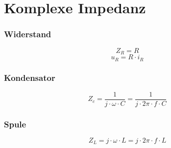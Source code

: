 



\section{Komplexe Impedanz}

\subsubsection{Widerstand}
\[ Z_R = R \]
\[ u_R = R \cdot i_R \]

\subsubsection{Kondensator}
\[ Z_c = \frac{1}{j \cdot \omega \cdot C} = \frac{1}{j \cdot 2 \pi \cdot f \cdot C} \]

\subsubsection{Spule}
\[ Z_L = j \cdot \omega \cdot L = j \cdot 2 \pi \cdot f \cdot L \]

